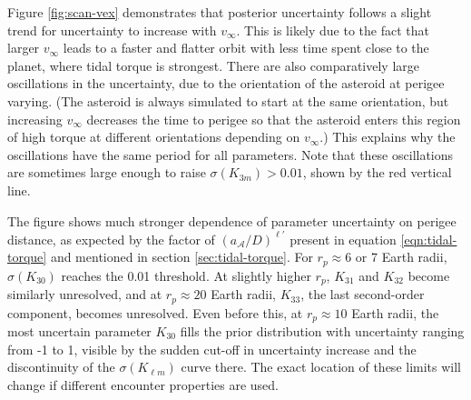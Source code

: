 \documentclass[fleqn,usenatbib]{mnras}
\begin{document}
Figure \ref{fig:scan-vex} demonstrates that posterior uncertainty follows a slight trend for uncertainty to increase with $v_\infty$. This is likely due to the fact that larger $v_\infty$ leads to a faster and flatter orbit with less time spent close to the planet, where tidal torque is strongest. There are also comparatively large oscillations in the uncertainty, due to the orientation of the asteroid at perigee varying. (The asteroid is always simulated to start at the same orientation, but increasing $v_\infty$ decreases the time to perigee so that the asteroid enters this region of high torque at different orientations depending on $v_\infty$.) This explains why the oscillations have the same period for all parameters. Note that these oscillations are sometimes large enough to raise $\sigma(K_{3m}) > 0.01$, shown by the red vertical line. 


The figure shows much stronger dependence of parameter uncertainty on perigee distance, as expected by the factor of $(a_\mathcal{A}/D)^{\ell'}$ present in equation \ref{eqn:tidal-torque} and mentioned in section \ref{sec:tidal-torque}. For $r_p \approx 6$ or 7 Earth radii, $\sigma(K_{30})$ reaches the 0.01 threshold. At slightly higher $r_p$, $K_{31}$ and $K_{32}$ become similarly unresolved, and at $r_p \approx 20$ Earth radii, $K_{33}$, the last second-order component, becomes unresolved. Even before this, at $r_p \approx 10$ Earth radii, the most uncertain parameter $K_{30}$ fills the prior distribution with uncertainty ranging from -1 to 1, visible by the sudden cut-off in uncertainty increase and the discontinuity of the $\sigma(K_{\ell m})$ curve there. The exact location of these limits will change if different encounter properties are used.

\end{document}
